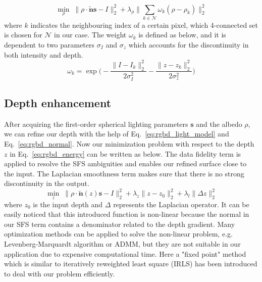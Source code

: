 \begin{equation}\label{eq:rgbd_albedo_estimate}
	\min_{\rho} \; \lVert \rho \cdot \tilde{\mathbf{n}} \mathbf{s} - I\rVert^2_2 + \lambda_{\rho} \lVert \sum_{k \in \mathcal{N}} \omega_k (\rho - \rho_k) \rVert^2_2
\end{equation}
where $k$ indicates the neighbouring index of a certain pixel, which 4-connected set is chosen for $\mathcal{N}$ in our case. 
The weight $\omega_k$ is defined as below, and it is dependent to two parameters $\sigma_I$ and $\sigma_z$ which accounts for the discontinuity in both intensity and depth.
\begin{equation}
	\omega_k=\exp\Bigg(-\dfrac{\lVert I - I_k \rVert^2_2}{2\sigma_I^2} -\dfrac{\lVert z - z_k \rVert^2_2}{2\sigma_z^2}\Bigg)
\end{equation}

\subsection{Depth enhancement}
After acquiring the first-order spherical lighting parameters $\mathbf{s}$ and the albedo $\rho$, we can refine our depth with the help of Eq.~\ref{eq:rgbd_light_model} and Eq.~\ref{eq:rgbd_normal}.
Now our minimization problem with respect to the depth $z$ in Eq.~\ref{eq:rgbd_energy} can be written as below. 
The data fidelity term is applied to resolve the SFS ambiguities and enables our refined surface close to the input. The Laplacian smoothness term makes sure that there is no strong discontinuity in the output. 
\begin{equation}\label{eq:rgbd_depth_refine}
	\min_{z} \; \lVert \rho \cdot \tilde{\mathbf{n}}(z) \mathbf{s} - I \rVert^2_2 + \lambda_z \lVert z - z_0\rVert^2_2 + \lambda_l \lVert \Delta z \rVert^2_2
\end{equation}
where $z_0$ is the input depth and $\Delta$ represents the  Laplacian operator. 
It can be easily noticed that this introduced function is non-linear because the normal in our SFS term contains a denominator related to the depth gradient. 
Many optimization methods can be applied to solve the non-linear problem, e.g. Levenberg-Marquardt algorithm or ADMM, but they are not suitable in our application due to expensive computational time. 
Here a "fixed point" method which is similar to iteratively reweighted least square (IRLS) has been introduced to deal with our problem efficiently. 


